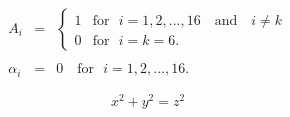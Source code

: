 \begin{eqnarray}
  A_i &=&
	\begin{cases}
		1 & \text{for~~} i = 1,2,...,16 \quad \text{and} \quad i \neq k \\
		0 & \text{for~~} i = k = 6.
	\end{cases} \\ \\
	\alpha_i &=& 0 \quad \text{for~~} i = 1,2,...,16.
\end{eqnarray}


\begin{equation}
 \boxed{x^2+y^2 = z^2}
\end{equation}


